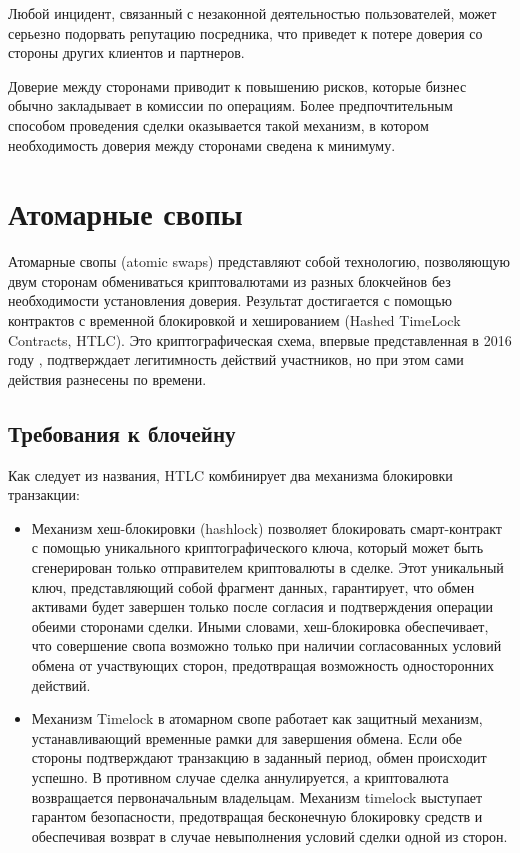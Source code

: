 Любой инцидент, связанный с незаконной деятельностью пользователей, может серьезно подорвать репутацию посредника, что приведет к потере доверия со стороны других клиентов и партнеров.

Доверие между сторонами приводит к повышению рисков, которые бизнес обычно закладывает в комиссии по операциям. Более предпочтительным способом проведения сделки оказывается такой механизм, в котором необходимость доверия между сторонами сведена к минимуму.

\section{Атомарные свопы}

Атомарные свопы (atomic swaps) представляют собой технологию, позволяющую двум сторонам обмениваться криптовалютами из разных блокчейнов без необходимости установления доверия. Результат достигается с помощью контрактов с временной блокировкой и хешированием (Hashed TimeLock Contracts, HTLC). Это криптографическая схема, впервые представленная в 2016 году \cite{label14}, подтверждает легитимность действий участников, но при этом сами действия разнесены по времени.

\subsection{Требования к блочейну}

Как следует из названия, HTLC комбинирует два механизма блокировки транзакции:

\begin{itemize}
\item Механизм хеш-блокировки (hashlock) позволяет блокировать смарт-контракт с помощью уникального криптографического ключа, который может быть сгенерирован только отправителем криптовалюты в сделке. Этот уникальный ключ, представляющий собой фрагмент данных, гарантирует, что обмен активами будет завершен только после согласия и подтверждения операции обеими сторонами сделки. Иными словами, хеш-блокировка обеспечивает, что совершение свопа возможно только при наличии согласованных условий обмена от участвующих сторон, предотвращая возможность односторонних действий.
\item Механизм Timelock в атомарном свопе работает как защитный механизм, устанавливающий временные рамки для завершения обмена. Если обе стороны подтверждают транзакцию в заданный период, обмен происходит успешно. В противном случае сделка аннулируется, а криптовалюта возвращается первоначальным владельцам. Механизм timelock выступает гарантом безопасности, предотвращая бесконечную блокировку средств и обеспечивая возврат в случае невыполнения условий сделки одной из сторон.
\end{itemize}

